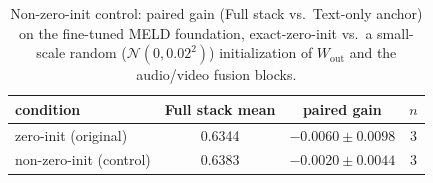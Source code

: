\begin{table}[t]
\centering
\caption{Non-zero-init control: paired gain (Full stack vs.\ Text-only anchor) on the fine-tuned MELD foundation, exact-zero-init vs.\ a small-scale random ($\mathcal{N}(0, 0.02^2)$) initialization of $W_{\text{out}}$ and the audio/video fusion blocks.}
\label{tab:nonzero-init-paired-gain}
\begin{tabular}{lccc}
\toprule
condition & Full stack mean & paired gain & $n$ \\
\midrule
zero-init (original) & 0.6344 & $-0.0060 \pm 0.0098$ & 3 \\
non-zero-init (control) & 0.6383 & $-0.0020 \pm 0.0044$ & 3 \\
\bottomrule
\end{tabular}
\end{table}
